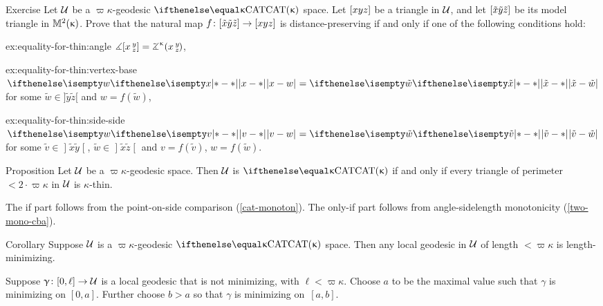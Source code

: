 \begin{thm}{Exercise}\label{ex:equality-for-thin}
Let $\mathcal{U}$ be a $\varpi\kappa$-geodesic $\CAT\kappa$ space.
Let $[{x}{y}{z}]$ be a triangle in $\mathcal{U}$,
and let $[{\tilde x}{\tilde y}{\tilde z}]$ be its model triangle in $\mathbb{M}_{{}}^{2}({\upkappa})$.
Prove that the natural map $f\:\trig{\tilde x}{\tilde y}{\tilde z}\to \trig xyz$ 
 is distance-preserving if and only if one of the following conditions hold:

\begin{subthm}{ex:equality-for-thin:angle}
$\mangle\hinge x y z= \angk\kappa x y z$,
\end{subthm}

\begin{subthm}{ex:equality-for-thin:vertex-base}
$\dist{x}{w}{}=\dist{\tilde x}{\tilde w}{}$ for some  $\tilde w\in]\tilde y\tilde z[$ and
$w= f(\tilde w)$,   
\end{subthm}

\begin{subthm}{ex:equality-for-thin:side-side} 
$\dist{v}{w}{}=\dist{\tilde v}{\tilde w}{}$ for some  
$\tilde v\in \mathopen{]}\tilde x \tilde y\mathclose{[}$,
$\tilde w\in\mathopen{]}\tilde x \tilde z\mathclose{[}$
and $v=f(\tilde v)$, $w=f(\tilde w)$.
\end{subthm} 

\end{thm}

{\sloppy 

\begin{thm}{Proposition}\label{prop:k-thin}
Let $\mathcal{U}$ be a $\varpi\kappa$-geodesic space. 
Then $\mathcal{U}$ is  $\CAT\kappa$
if and only if every triangle of perimeter $<2\cdot \varpi\kappa$ in $\mathcal{U}$  is $\kappa$-thin.
\end{thm}

}

The if part follows from the point-on-side comparison (\ref{cat-monoton}).  
The only-if part follows from angle-sidelength  monotonicity (\ref{two-mono-cba}).
\qeds


\begin{thm}{Corollary}\label{cor:loc-geod-are-min}
Suppose $\mathcal{U}$ is a $\varpi\kappa$-geodesic $\CAT\kappa$ space.  
Then any local geodesic in $\mathcal{U}$ of length $<\varpi\kappa$ is length-minimizing.
\end{thm}

Suppose $\gamma\:[0,\ell]\to\spc{U}$ is a local geodesic  that is not minimizing, with $\ell<\varpi\kappa$.
Choose $a$ to be the maximal value 
such that $\gamma$ is minimizing on $[0,a]$.
Further choose $b>a$ so that $\gamma$ is minimizing on~$[a,b]$.


